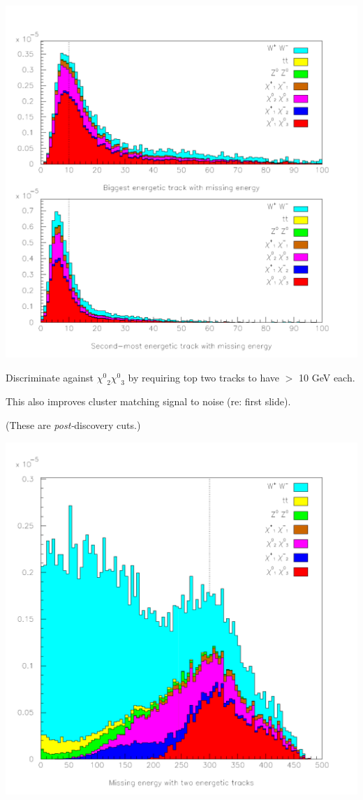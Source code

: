 \documentclass[landscape]{article}
\begin{document}
\begin{center} \includegraphics[height=0.8\textheight]{withmatching_2.pdf} \end{center}

Discriminate against $\mbox{$\chi^0$}_2 \mbox{$\chi^0$}_3$ by
requiring top two tracks to have $>$ 10 GeV each.

\vspace{0.2 cm}
This also improves cluster matching signal to noise (re: first slide).

\vspace{0.2 cm}
(These are {\it post-}discovery cuts.)

\pagebreak

\begin{center} \includegraphics[height=0.8\textheight]{withmatching_3.pdf} \end{center}
\end{document}
